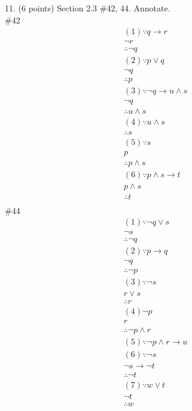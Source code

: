 \documentclass{article}
\begin{document}
11. (6 points) Section 2.3 \#42, 44. Annotate.\\
\#42
\begin{align*}
    (1)
    \because q \rightarrow r \tag{by assumption b}\\
    \neg r \tag{by assumption d}\\
    \therefore \neg q\tag{by Modus Tollens}\\
    (2)
    \because p \vee q\tag{by assumption a}\\
    \neg q\tag{by Step 1}\\
    \therefore p \tag{by Elimination}\\
    (3)
    \because \neg q \rightarrow u\wedge s\tag{by assumption e}\\
    \neg q\tag{by Step 1)}\\
    \therefore u \wedge s\tag{by Modus Ponens}\\
    (4)
    \because u\wedge s\tag{by Step 3}\\
    \therefore s\tag{by Specialization}\\
    (5)
    \because s\tag{by Step 4}\\
    p\tag{by Step 2}\\
    \therefore p\wedge s\tag{by Conjunction}\\
    (6)
    \because p\wedge s \rightarrow t\tag{by Assumption c}\\
    p\wedge s\tag{by Step 5}\\
    \therefore t\tag{by Modus Ponens}\\
\end{align*}
\#44
\begin{align*}
    (1)
    \because\neg q \vee s \tag{by Assumption d}\\
    \neg s \tag{by Assumption e}\\
    \therefore \neg q\tag{by Elimination}\\
    (2)
    \because p \rightarrow q\tag{by Assumption a}\\
    \neg q\tag{by Step 1}\\
    \therefore \neg p\tag{by Modus Ponens}\\
    (3)
    \because \neg s\tag{by Assumption e}\\
    r\vee s\tag{by Assumption b}\\
    \therefore r\tag{by Elimination}\\
    (4)
    \neg p \tag{by Step 2}\\
     r \tag{by Step 3}\\
    \therefore \neg p \wedge r\tag{by Conjunction}\\
    (5)
    \because\neg p\wedge r \rightarrow u\tag{by Assumption f}\\
    (6)
    \because \neg s\tag{by Assumption e}\\
    \neg s \rightarrow \neg t\tag{by Assumption c}\\
    \therefore \neg t\tag{by Modus Ponens}\\
    (7)
    \because w\vee t\tag{by Assumption g}\\
    \neg t \tag{by Step 6}\\
    \therefore w \tag{by Elimination}
\end{align*}
\end{document}
